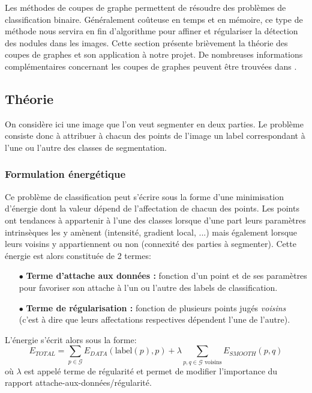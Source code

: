\documentclass{article}
\newcommand{\lab}{\text{label}}
\begin{document}
Les méthodes de coupes de graphe permettent de résoudre des problèmes de classification binaire. Généralement coûteuse en temps et en mémoire, ce type de méthode nous servira en fin d'algorithme pour affiner et régulariser la détection des nodules dans les images. Cette section présente brièvement la théorie des coupes de graphes et son application à notre projet. De nombreuses informations complémentaires concernant les coupes de graphes peuvent être trouvées dans \cite{bib:GC04, bib:GC05}.		

\subsection{Théorie}

On considère ici une image que l'on veut segmenter en deux parties. Le problème consiste donc à attribuer à chacun des points de l'image un label correspondant à l'une ou l'autre des classes de segmentation.

\subsubsection{Formulation énergétique}

Ce problème de classification peut s'écrire sous la forme d'une minimisation d'énergie dont la valeur dépend de l'affectation de chacun des points. Les points ont tendances à appartenir à l'une des classes lorsque d'une part leurs paramètres intrinsèques les y amènent (intensité, gradient local, ...) mais également lorsque leurs voisins y appartiennent ou non (connexité des parties à segmenter). Cette énergie est alors constituée de 2 termes:
\begin{itemize}
	\item[$\bullet$]\textbf{Terme d'attache aux données :} fonction d'un point et de ses paramètres pour favoriser son attache à l'un ou l'autre des labels de classification.
	\item[$\bullet$]\textbf{Terme de régularisation :} fonction de plusieurs points jugés \textit{voisins} (c'est à dire que leurs affectations respectives dépendent l'une de l'autre).
\end{itemize}
L'énergie s'écrit alors sous la forme:
\[
	E_{TOTAL} = \sum_{p \in \mathcal{G}} E_{DATA}(\lab(p), p) + \lambda \sum _{p,q \in \mathcal{G} \text{ voisins}} E_{SMOOTH}(p,q)
\]
où $\lambda$ est appelé terme de régularité et permet de modifier l'importance du rapport attache-aux-données/régularité.\\
\end{document}
